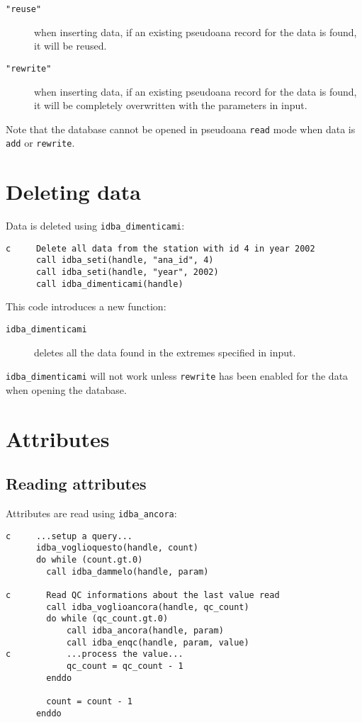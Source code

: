\documentclass[draft,12pt,a4paper,twoside]{book}
\begin{document}
\begin{description}
\item[{\tt "reuse"}] when inserting data, if an existing pseudoana record for
	       the data is found, it will be reused.
\item[{\tt "rewrite"}] when inserting data, if an existing pseudoana record for
	     the data is found, it will be completely overwritten with
	     the parameters in input.
\end{description}

Note that the database cannot be opened in pseudoana {\tt read} mode when data
is {\tt add} or {\tt rewrite}.
  
\section{Deleting data}

Data is deleted using {\tt idba\_dimenticami}:
\label{fun-idba_dimenticami}

\begin{verbatim}
c     Delete all data from the station with id 4 in year 2002
      call idba_seti(handle, "ana_id", 4)
      call idba_seti(handle, "year", 2002)
      call idba_dimenticami(handle)
\end{verbatim}

This code introduces a new function:

\begin{description}
\item[{\tt idba\_dimenticami}]
  deletes all the data found in the extremes specified in input.
\end{description}

{\tt idba\_dimenticami} will not work unless {\tt rewrite} has been enabled for
the data when opening the database.

\section {Attributes}

\subsection{Reading attributes}

Attributes are read using {\tt idba\_ancora}:
\label{fun-idba_voglioancora}
\label{fun-idba_ancora}

\begin{verbatim}
c     ...setup a query...
      idba_voglioquesto(handle, count)
      do while (count.gt.0)
        call idba_dammelo(handle, param)

c       Read QC informations about the last value read
        call idba_voglioancora(handle, qc_count)
        do while (qc_count.gt.0)
            call idba_ancora(handle, param) 
            call idba_enqc(handle, param, value)
c           ...process the value...
            qc_count = qc_count - 1
        enddo

        count = count - 1
      enddo
\end{verbatim}
\end{document}
